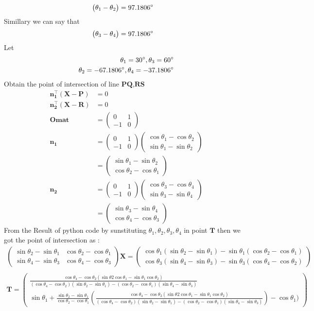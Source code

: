 \documentclass[12pt]{article}
\newcommand{\myvec}[1]{\ensuremath{\begin{pmatrix}#1\end{pmatrix}}}
\let\vec\mathbf
\begin{document}
\begin{align}
	\myvec{\theta_1-\theta_2}&=97.1806\degree
	\end{align}
Simillary we can say that
\begin{align}
	\myvec{\theta_3-\theta_4}&=97.1806\degree 		       
\end{align}	
Let
\begin{align}
{\theta_1=30\degree},{\theta_3=60\degree}\\
{\theta_2=-67.1806\degree},{\theta_4=-37.1806\degree}
\end{align}
Obtain the point of intersection of line $\vec{PQ}$,$\vec{RS}$
\begin{align}
\vec{n_1^{\top}}(\vec{X}-\vec{P})&=0\\
\vec{n_2^{\top}}(\vec{X}-\vec{R})&=0\\
\vec{Omat}&=\myvec{0&1\\-1&0}\\
\vec{n_1}&=\myvec{0&1\\-1&0}\myvec{\cos \theta_1-\cos \theta_2\\\sin \theta_1-\sin \theta_2}\\
&=\myvec{\sin \theta_1-\sin \theta_2\\\cos \theta_2-\cos \theta_1}\\
\vec{n_2}&=\myvec{0&1\\-1&0}\myvec{\cos\theta_3-\cos \theta_4\\\sin \theta_3-\sin \theta_4}\\
&=\myvec{\sin \theta_3-\sin \theta_4\\\cos \theta_4-\cos \theta_3}
\end{align}
From the Result of python code by sunstituting $\theta_1,\theta_2,\theta_3,\theta_4$ in point $\vec{T}$ then we got the point of intersection as :
\begin{multline}
\myvec{\sin \theta_2-\sin \theta_1&\cos \theta_2-\cos \theta_1\\\sin \theta_4-\sin \theta_3&\cos \theta_4-\cos \theta_3}\vec{X}=\myvec{\cos \theta_1(\sin \theta_2-\sin \theta_1)-\sin \theta_1(\cos \theta_2-\cos \theta_1)\\\cos \theta_3(\sin \theta_4-\sin \theta_3)-\sin \theta_3(\cos \theta_4-\cos \theta_2)}\\
\end{multline}
\begin{multline}
\vec{T}=\myvec{\frac{\cos \theta_4-\cos \theta_2(\sin \theta2 \cos \theta_1-\sin \theta_1 \cos \theta_2)}{(\cos\theta_4-\cos \theta_2)(\sin \theta_2-\sin \theta_1)-(\cos \theta_2-\cos \theta_1)(\sin \theta_4-\sin \theta_3)}\\[8pt]\sin \theta_1+\frac{\sin \theta_2-\sin \theta_1}{\cos \theta_2-\cos \theta_1}(\frac{\cos \theta_4-\cos \theta_2(\sin \theta2\cos \theta_1-\sin \theta_1\cos \theta_2)}{(\cos \theta_4-\cos \theta_2)(\sin \theta_2-\sin \theta_1)-(\cos \theta_2-\cos \theta_1)(\sin \theta_4-\sin \theta_3)})-\cos \theta_1)}
\end{multline}
\end{document}
